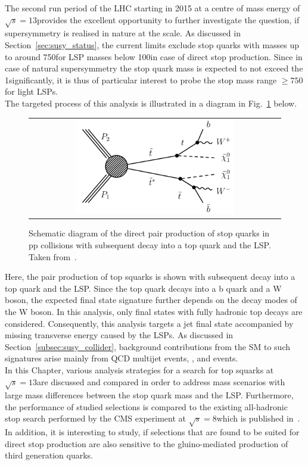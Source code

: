 The second run period of the LHC starting in 2015 at a centre of mass energy of $\sqrt{s} = 13$\tev provides the excellent opportunity to further investigate the question, if supersymmetry is realised in nature at the \tev scale. As discussed in Section~\ref{sec:susy_status}, the current limits exclude stop quarks with masses up to around 750\gev for LSP masses below 100\gev in case of direct stop production. Since in case of natural supersymmetry the stop quark mass is expected to not exceed the 1\tev significantly, it is thus of particular interest to probe the stop mass range $\ge 750$\gev for light LSPs. \\
The targeted process of this analysis is illustrated in a diagram in Fig.~\ref{fig:T2tt} below. \\ 
\begin{figure}[!h]
  \centering
  \begin{tabular}{c}
                \includegraphics[width=0.65\textwidth]{figures/T2tt.pdf} 
  \end{tabular}
  \caption{Schematic diagram of the direct pair production of stop quarks in pp collisions with subsequent decay into a top quark and the LSP. Taken from~\cite{bib:CMS:PhysicsResultsSUS}. }
  \label{fig:T2tt}
\end{figure}
   
Here, the pair production of top squarks is shown with subsequent decay into a top quark and the LSP. Since the top quark decays into a b quark and a W boson, the expected final state signature further depends on the decay modes of the W boson. In this analysis, only final states with fully hadronic top decays are considered. Consequently, this analysis targets a jet final state accompanied by missing transverse energy caused by the LSPs. As discussed in Section~\ref{subsec:susy_collider}, background contributions from the SM to such signatures arise mainly from QCD multijet events, \WJets, \ZJets and \ttbar events. \\
In this Chapter, various analysis strategies for a search for top squarks at $\sqrt{s} = 13$\tev are discussed and compared in order to address mass scenarios with large mass differences between the stop quark mass and the LSP. Furthermore, the performance of studied selections is compared to the existing all-hadronic stop search performed by the CMS experiment at $\sqrt{s} = 8$\tev which is published in~\cite{CMS-PAS-SUS-13-015}. In addition, it is interesting to study, if selections that are found to be suited for direct stop production are also sensitive to the gluino-mediated production of third generation quarks. \\

